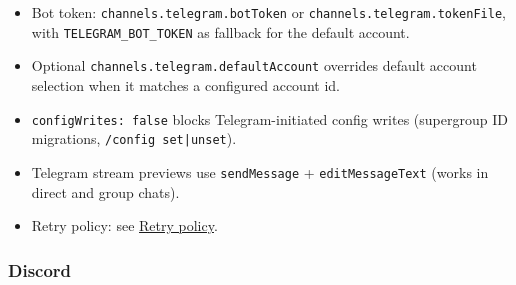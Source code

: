 \begin{itemize}
  \item Bot token: \texttt{channels.telegram.botToken} or \texttt{channels.telegram.tokenFile}, with \texttt{TELEGRAM\_BOT\_TOKEN} as fallback for the default account.
  \item Optional \texttt{channels.telegram.defaultAccount} overrides default account selection when it matches a configured account id.
  \item \texttt{configWrites: false} blocks Telegram-initiated config writes (supergroup ID migrations, \texttt{/config set|unset}).
  \item Telegram stream previews use \texttt{sendMessage} + \texttt{editMessageText} (works in direct and group chats).
  \item Retry policy: see \href{/concepts/retry}{Retry policy}.
\end{itemize}


\subsubsection{Discord}


